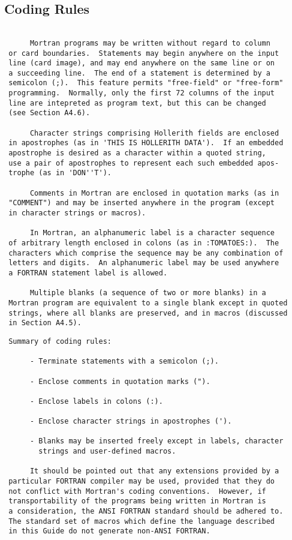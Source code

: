  \subsection{Coding Rules}
 \begin{verbatim}

      Mortran programs may be written without regard to column
 or card boundaries.  Statements may begin anywhere on the input
 line (card image), and may end anywhere on the same line or on
 a succeeding line.  The end of a statement is determined by a
 semicolon (;).  This feature permits "free-field" or "free-form"
 programming.  Normally, only the first 72 columns of the input
 line are intepreted as program text, but this can be changed
 (see Section A4.6).

      Character strings comprising Hollerith fields are enclosed
 in apostrophes (as in 'THIS IS HOLLERITH DATA').  If an embedded
 apostrophe is desired as a character within a quoted string,
 use a pair of apostrophes to represent each such embedded apos-
 trophe (as in 'DON''T').

      Comments in Mortran are enclosed in quotation marks (as in
 "COMMENT") and may be inserted anywhere in the program (except
 in character strings or macros).

      In Mortran, an alphanumeric label is a character sequence
 of arbitrary length enclosed in colons (as in :TOMATOES:).  The
 characters which comprise the sequence may be any combination of
 letters and digits.  An alphanumeric label may be used anywhere
 a FORTRAN statement label is allowed.

      Multiple blanks (a sequence of two or more blanks) in a
 Mortran program are equivalent to a single blank except in quoted
 strings, where all blanks are preserved, and in macros (discussed
 in Section A4.5).
\end{verbatim}
\newpage \begin{verbatim}
 Summary of coding rules:

      - Terminate statements with a semicolon (;).

      - Enclose comments in quotation marks (").

      - Enclose labels in colons (:).

      - Enclose character strings in apostrophes (').

      - Blanks may be inserted freely except in labels, character
        strings and user-defined macros.

      It should be pointed out that any extensions provided by a
 particular FORTRAN compiler may be used, provided that they do
 not conflict with Mortran's coding conventions.  However, if
 transportability of the programs being written in Mortran is
 a consideration, the ANSI FORTRAN standard should be adhered to.
 The standard set of macros which define the language described
 in this Guide do not generate non-ANSI FORTRAN.
 \end{verbatim}
